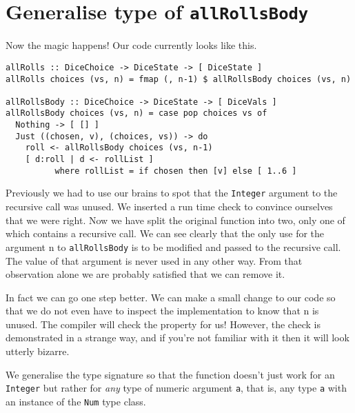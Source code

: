 \section{Generalise type of \texttt{allRollsBody}}


Now the magic happens! Our code currently looks like this.

\begin{verbatim}
allRolls :: DiceChoice -> DiceState -> [ DiceState ]
allRolls choices (vs, n) = fmap (, n-1) $ allRollsBody choices (vs, n)

allRollsBody :: DiceChoice -> DiceState -> [ DiceVals ]
allRollsBody choices (vs, n) = case pop choices vs of
  Nothing -> [ [] ]
  Just ((chosen, v), (choices, vs)) -> do
    roll <- allRollsBody choices (vs, n-1)
    [ d:roll | d <- rollList ]
          where rollList = if chosen then [v] else [ 1..6 ]
\end{verbatim}
Previously we had to use our brains to spot that the \texttt{Integer} argument to the recursive call was unused. We inserted a run time check to convince ourselves that we were right. Now we have split the original function into two, only one of which contains a recursive call. We can see clearly that the only use for the argument n to \texttt{allRollsBody} is to be modified and passed to the recursive call. The value of that argument is never used in any other way. From that observation alone we are probably satisfied that we can remove it.

In fact we can go one step better. We can make a small change to our code so that we do not even have to inspect the implementation to know that n is unused. The compiler will check the property for us! However, the check is demonstrated in a strange way, and if you're not familiar with it then it will look utterly bizarre.

We generalise the type signature so that the function doesn't just work for an \texttt{Integer} but rather for \textit{any} type of numeric argument \texttt{a}, that is, any type \texttt{a} with an instance of the \texttt{Num} type class.

